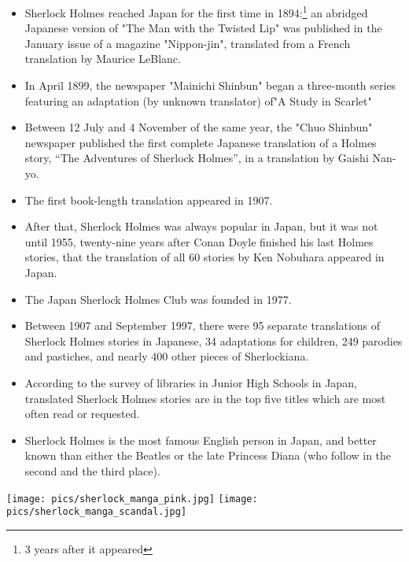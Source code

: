 \documentclass[a4paper,landscape,headrule,footrule,xetex]{foils}
\begin{document}
\begin{itemize}
\item Sherlock Holmes reached Japan for the first time in
  1894:\footnote{3 years after it appeared} an
  abridged Japanese version of "The Man with the Twisted Lip" was
  published in the January issue of a magazine "Nippon-jin",
  translated from a French translation by Maurice LeBlanc.
\item  In April 1899, the newspaper "Mainichi Shinbun" began a
  three-month series featuring an adaptation (by unknown translator)
  of"A Study in Scarlet"
\item Between 12 July and 4 November of the same year, the "Chuo
  Shinbun" newspaper published the first complete Japanese translation
  of a Holmes story, ``The Adventures of Sherlock Holmes'', in a
  translation by Gaishi Nan-yo.
\item The first book-length translation appeared in 1907.
\end{itemize} 

\begin{itemize}
\item After that, Sherlock Holmes was always popular in Japan, but it
  was not until 1955, twenty-nine years after Conan Doyle finished his
  last Holmes stories, that the translation of all 60 stories by Ken
  Nobuhara appeared in Japan.
  
\item The Japan Sherlock Holmes Club was founded in 1977.
\item  Between 1907 and September 1997, there were 95
  separate translations of Sherlock Holmes stories in Japanese, 34 adaptations for children, 249 parodies
  and pastiches, and nearly 400 other pieces of Sherlockiana.
\item According to the survey of libraries in Junior High Schools in
  Japan, translated Sherlock Holmes stories are in the top five titles which are most often read or requested. 
\item  Sherlock Holmes is the most famous English person in Japan, and
  better known than either the Beatles or the late Princess Diana (who follow in the second and the third place).
\end{itemize}


\texttt{[image: pics/sherlock\_manga\_pink.jpg]}
\texttt{[image: pics/sherlock\_manga\_scandal.jpg]}
\end{document}
